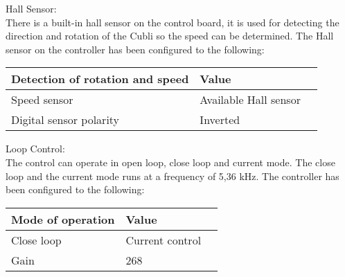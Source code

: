 Hall Sensor:\\
There is a built-in hall sensor on the control board, it is used for detecting the direction and rotation of the Cubli so the speed can be determined. The Hall sensor on the controller has been configured to the following:
\begin{table}[H]
	\begin{tabular}{|l|l|p{4.3cm}|}
		\hline%
		\textbf{Detection of rotation and speed}       &  \textbf{Value}         \\
		\hline%
		Speed sensor                                & Available Hall sensor           \\
		\hline%
		Digital sensor polarity							  & Inverted              \\
		\hline%
	\end{tabular}
\end{table}

Loop Control:\\
The control can operate in open loop, close loop and current mode. The close loop and the current mode runs at a frequency of 5,36 kHz. The controller has been configured to the following:
\begin{table}[H]
	\begin{tabular}{|l|l|p{4.3cm}|}
		\hline%
		\textbf{Mode of operation}       &  \textbf{Value}         \\
		\hline%
		Close loop                                & Current control           \\
		\hline%
		Gain							  & 268              \\
		\hline%
	\end{tabular}
\end{table}

